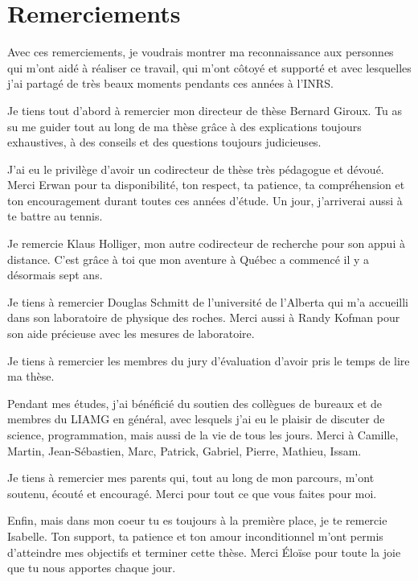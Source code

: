 \chapter*{Remerciements}
\setlength{\parindent}{0cm}
\setlength{\parskip}{1em}
Avec ces remerciements, je voudrais montrer ma reconnaissance aux personnes qui
m'ont aidé à réaliser ce travail, qui m'ont côtoyé et supporté et avec
lesquelles j'ai partagé de très beaux moments pendants ces années à l'INRS. \par

Je tiens tout d’abord à remercier mon directeur de thèse Bernard Giroux. Tu as
su me guider tout au long de ma thèse grâce à des explications toujours
exhaustives, à des conseils et des questions toujours judicieuses.

J’ai eu le privilège d’avoir un codirecteur de thèse très pédagogue et dévoué.
Merci Erwan pour ta disponibilité, ton respect, ta patience, ta compréhension et
ton encouragement durant toutes ces années d’étude. Un jour, j'arriverai aussi à
te battre au tennis.\par
Je remercie Klaus Holliger, mon autre codirecteur de recherche pour son appui à
distance. C'est grâce à toi que mon aventure à Québec a commencé il y a
désormais sept ans.\par

Je tiens à remercier Douglas Schmitt de l’université de l'Alberta qui m’a
accueilli dans son laboratoire de physique des roches. Merci aussi à Randy
Kofman pour son aide précieuse avec les mesures de laboratoire.\par

Je tiens à remercier les membres du jury d’évaluation d’avoir pris le temps de
lire
ma thèse.\par

Pendant mes études, j’ai bénéficié du soutien des collègues de bureaux et de
membres du LIAMG en général, avec lesquels j'ai eu le plaisir de discuter de
science, programmation, mais aussi de la vie de tous les jours. Merci à
Camille, Martin, Jean-Sébastien, Marc, Patrick, Gabriel, Pierre, Mathieu,
Issam.\par

Je tiens à remercier mes parents qui, tout au long de mon parcours, m’ont
soutenu, écouté et encouragé. Merci pour tout ce que vous faites pour moi.\par

Enfin, mais dans mon coeur tu es toujours à la première place, je te remercie
Isabelle. Ton support, ta patience et ton amour inconditionnel m’ont permis
d’atteindre mes objectifs et terminer cette thèse. Merci Éloïse pour toute la
joie que tu nous apportes chaque jour.
